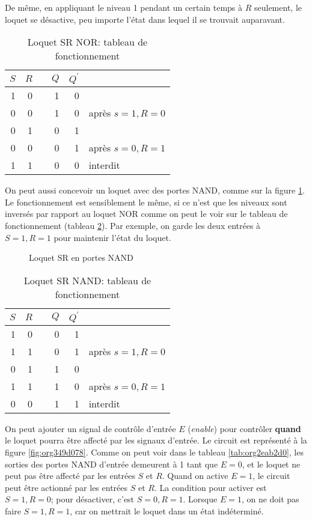 \documentclass[letter, oneside]{book}
\begin{document}
\begin{enumerate}
De même, en appliquant le niveau 1 pendant un certain
temps à \(R\) seulement, le loquet se désactive, peu importe l'état
dans lequel il se trouvait auparavant.

\begin{table}[htbp]
\caption{\label{tab:org16edc4d}Loquet SR NOR: tableau de fonctionnement}
\centering
\begin{tabular}{rrlrrl}
\(S\) & \(R\) &  & \(Q\) & \(Q^\prime\) & \\[0pt]
\hline
1 & 0 &  & 1 & 0 & \\[0pt]
0 & 0 &  & 1 & 0 & après \(s=1, R=0\)\\[0pt]
0 & 1 &  & 0 & 1 & \\[0pt]
0 & 0 &  & 0 & 1 & après \(s=0, R=1\)\\[0pt]
1 & 1 &  & 0 & 0 & interdit\\[0pt]
\end{tabular}
\end{table}

On peut aussi concevoir un loquet avec des portes NAND, comme sur la
figure \ref{fig:orge6f96bc}. Le fonctionnement est sensiblement le même,
si ce n'est que les niveaux sont inversés par rapport au loquet NOR
comme on peut le voir sur le tableau de fonctionnement (tableau
\ref{tab:orgdce47ab}). Par exemple, on garde les deux entrées à \(S=1, R=1\)
pour maintenir l'état du loquet.

\begin{figure}[htbp]
\centering

\caption{\label{fig:orge6f96bc}Loquet SR en portes NAND}
\end{figure}

\begin{table}[htbp]
\caption{\label{tab:orgdce47ab}Loquet SR NAND: tableau de fonctionnement}
\centering
\begin{tabular}{rrlrrl}
\(S\) & \(R\) &  & \(Q\) & \(Q^\prime\) & \\[0pt]
\hline
1 & 0 &  & 0 & 1 & \\[0pt]
1 & 1 &  & 0 & 1 & après \(s=1, R=0\)\\[0pt]
0 & 1 &  & 1 & 0 & \\[0pt]
1 & 1 &  & 1 & 0 & après \(s=0, R=1\)\\[0pt]
0 & 0 &  & 1 & 1 & interdit\\[0pt]
\end{tabular}
\end{table}

On peut ajouter un signal de contrôle d'entrée \(E\) (\emph{enable}) pour
contrôler \textbf{quand} le loquet pourra être affecté par les signaux
d'entrée. Le circuit est représenté à la figure \ref{fig:org349d078}. Comme
on peut voir dans le tableau \ref{tab:org2eab2d0}, les sorties des portes
NAND d'entrée demeurent à 1 tant que \(E = 0\), et le loquet ne peut
pas être affecté par les entrées \(S\) et \(R\). Quand on active \(E
= 1\), le circuit peut être actionné par les entrées \(S\) et \(R\). La condition pour activer est \(S=1, R=0\); pour désactiver,
c'est \(S=0, R=1\). Lorsque \(E = 1\), on ne doit pas faire \(S=1,
R=1\), car on mettrait le loquet dans un état indéterminé.


\end{enumerate}
\end{document}
